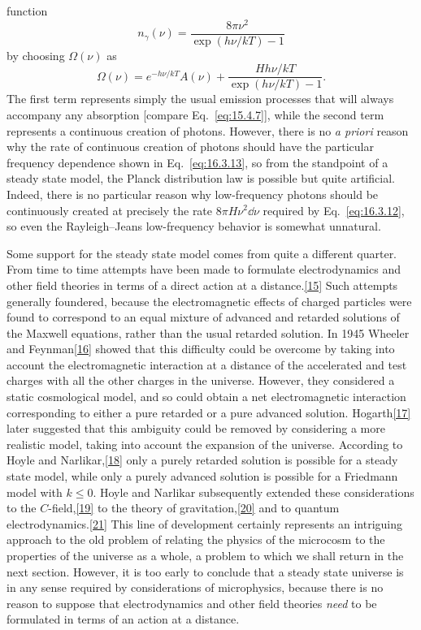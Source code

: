 function
\[
  n_\gamma(\nu)
  =
  \frac{8\pi\nu^2}{\exp(h\nu/kT)-1}
\]
by choosing \(\Omega(\nu)\) as
\begin{equation}
  \Omega(\nu)
  =
  e^{-h\nu/kT}A(\nu)
  +
  \frac{Hh\nu/kT}{\exp(h\nu/kT)-1}.
  \tag{16.3.13}\label{eq:16.3.13}
\end{equation}
The first term represents simply the usual emission processes that will always
accompany any absorption [compare Eq.~\eqref{eq:15.4.7}], while the second term
represents a continuous creation of photons. However, there is no \emph{a
priori} reason why the rate of continuous creation of photons should have the
particular frequency dependence shown in Eq.~\eqref{eq:16.3.13}, so from the
standpoint of a steady state model, the Planck distribution law is possible
but quite artificial. Indeed, there is no particular reason why low-frequency
photons should be continuously created at precisely the rate
\(8\pi H\nu^2\dd\nu\) required by Eq.~\eqref{eq:16.3.12}, so even the
Rayleigh--Jeans low-frequency behavior is somewhat unnatural.

Some support for the steady state model comes from quite a different quarter.
From time to time attempts have been made to formulate electrodynamics and
other field theories in terms of a direct action at a
distance.\hyperref[ch16-ref-15]{[15]} Such attempts generally foundered,
because the electromagnetic effects of charged particles were found to
correspond to an equal mixture of advanced and retarded solutions of the
Maxwell equations, rather than the usual retarded solution. In 1945 Wheeler and
Feynman\hyperref[ch16-ref-16]{[16]} showed that this difficulty could be
overcome by taking into account the electromagnetic interaction at a distance
of the accelerated and test charges with all the other charges in the universe.
However, they considered a static cosmological model, and so could obtain a net
electromagnetic interaction corresponding to either a pure retarded or a pure
advanced solution. Hogarth\hyperref[ch16-ref-17]{[17]} later suggested that
this ambiguity could be removed by considering a more realistic model, taking
into account the expansion of the universe. According to Hoyle and
Narlikar,\hyperref[ch16-ref-18]{[18]} only a purely retarded solution is
possible for a steady state model, while only a purely advanced solution is
possible for a Friedmann model with \(k\leq0\). Hoyle and Narlikar subsequently
extended these considerations to the
\(C\)-field,\hyperref[ch16-ref-19]{[19]} to the theory of
gravitation,\hyperref[ch16-ref-20]{[20]} and to quantum
electrodynamics.\hyperref[ch16-ref-21]{[21]} This line of development
certainly represents an intriguing approach to the old problem of relating the
physics of the microcosm to the properties of the universe as a whole, a problem
to which we shall return in the next section. However, it is too early to
conclude that a steady state universe is in any sense required by
considerations of microphysics, because there is no reason to suppose that
electrodynamics and other field theories \emph{need} to be formulated in terms
of an action at a distance.
